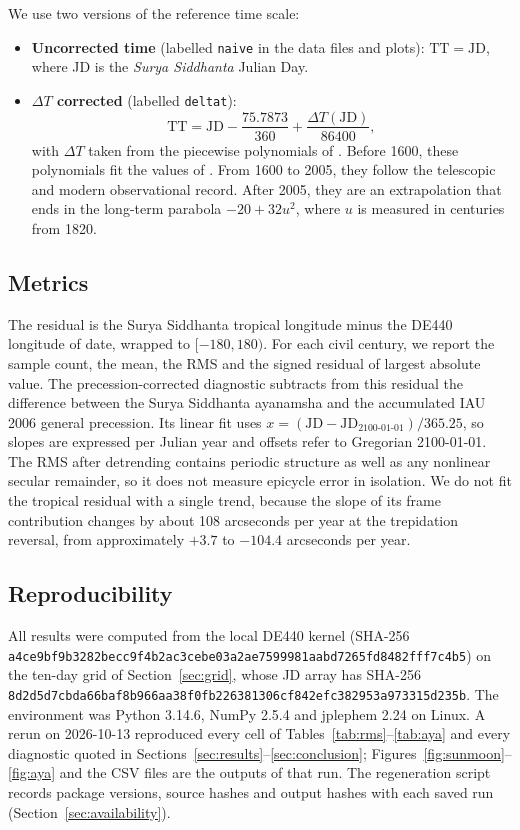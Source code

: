 \documentclass[11pt,a4paper]{article}
\newcommand{\SuSi}{\textit{Surya Siddhanta}}
\newcommand{\dT}{$\Delta T$}
\newcommand{\file}[1]{\texttt{#1}}
\begin{document}
We use two versions of the reference time scale:
\begin{itemize}
  \item \textbf{Uncorrected time} (labelled \file{naive} in the data files and plots): $\mathrm{TT} = \mathrm{JD}$, where JD is the \SuSi{} Julian Day.
  \item \textbf{\dT{} corrected} (labelled \file{deltat}):
  \[
    \mathrm{TT} = \mathrm{JD} - \frac{75.7873}{360} + \frac{\Delta T(\mathrm{JD})}{86400},
  \]
  with \dT{} taken from the piecewise polynomials of \citet{espenak2006}. Before 1600, these polynomials fit the values of \citet{morrison2004}. From 1600 to 2005, they follow the telescopic and modern observational record. After 2005, they are an extrapolation that ends in the long-term parabola $-20 + 32u^2$, where $u$ is measured in centuries from 1820.
\end{itemize}

\subsection{Metrics}
\label{sec:metrics}

The residual is the Surya Siddhanta tropical longitude minus the DE440 longitude of date, wrapped to $[-180, 180)$. For each civil century, we report the sample count, the mean, the RMS and the signed residual of largest absolute value. The precession-corrected diagnostic subtracts from this residual the difference between the Surya Siddhanta ayanamsha and the accumulated IAU 2006 general precession. Its linear fit uses $x = (\mathrm{JD} - \mathrm{JD}_{2100\text{-}01\text{-}01})/365.25$, so slopes are expressed per Julian year and offsets refer to Gregorian 2100-01-01. The RMS after detrending contains periodic structure as well as any nonlinear secular remainder, so it does not measure epicycle error in isolation. We do not fit the tropical residual with a single trend, because the slope of its frame contribution changes by about 108 arcseconds per year at the trepidation reversal, from approximately $+3.7$ to $-104.4$ arcseconds per year.

\subsection{Reproducibility}

All results were computed from the local DE440 kernel (SHA-256 \texttt{a4ce9bf9\allowbreak b3282bec\allowbreak c9f4b2ac\allowbreak 3cebe03a\allowbreak 2ae75999\allowbreak 81aabd72\allowbreak 65fd8482\allowbreak fff7c4b5}) on the ten-day grid of Section~\ref{sec:grid}, whose JD array has SHA-256 \texttt{8d2d5d7c\allowbreak bda66baf\allowbreak 8b966aa3\allowbreak 8f0fb226\allowbreak 381306cf\allowbreak 842efc38\allowbreak 2953a973\allowbreak 315d235b}. The environment was Python 3.14.6, NumPy 2.5.4 and jplephem 2.24 on Linux. A rerun on 2026-10-13 reproduced every cell of Tables~\ref{tab:rms}--\ref{tab:aya} and every diagnostic quoted in Sections~\ref{sec:results}--\ref{sec:conclusion}; Figures~\ref{fig:sunmoon}--\ref{fig:aya} and the CSV files are the outputs of that run. The regeneration script records package versions, source hashes and output hashes with each saved run (Section~\ref{sec:availability}).
\end{document}
